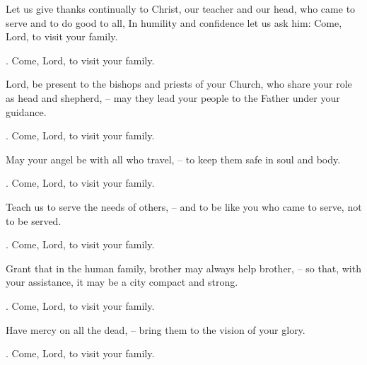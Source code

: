 \lettrine[lines=2]{L}{}et us give thanks continually to Christ, our teacher and our head, who came to serve and to do good to all, In humility and confidence let us ask him: Come, Lord, to visit your family.
\par \Rbar. Come, Lord, to visit your family.

Lord, be present to the bishops and priests of your Church, who share your role as head and shepherd,
– may they lead your people to the Father under your guidance.
\par \Rbar. Come, Lord, to visit your family.

May your angel be with all who travel,
– to keep them safe in soul and body.
\par \Rbar. Come, Lord, to visit your family.

Teach us to serve the needs of others,
– and to be like you who came to serve, not to be served.
\par \Rbar. Come, Lord, to visit your family.

Grant that in the human family, brother may always help brother,
– so that, with your assistance, it may be a city compact and strong.
\par \Rbar. Come, Lord, to visit your family.

Have mercy on all the dead,
– bring them to the vision of your glory.
\par \Rbar. Come, Lord, to visit your family.
